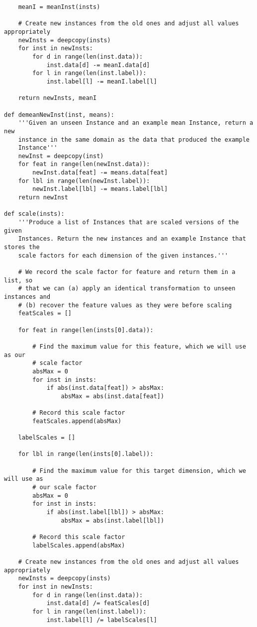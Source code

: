 \documentclass{article}
\begin{document}
\begin{verbatim}
    meanI = meanInst(insts)

    # Create new instances from the old ones and adjust all values appropriately
    newInsts = deepcopy(insts)
    for inst in newInsts:
        for d in range(len(inst.data)):
            inst.data[d] -= meanI.data[d]
        for l in range(len(inst.label)):
            inst.label[l] -= meanI.label[l]
    
    return newInsts, meanI

def demeanNewInst(inst, means):
    '''Given an unseen Instance and an example mean Instance, return a new
    instance in the same domain as the data that produced the example
    Instance'''
    newInst = deepcopy(inst)
    for feat in range(len(newInst.data)):
        newInst.data[feat] -= means.data[feat]
    for lbl in range(len(newInst.label)):
        newInst.label[lbl] -= means.label[lbl]
    return newInst

def scale(insts):
    '''Produce a list of Instances that are scaled versions of the given
    Instances. Return the new instances and an example Instance that stores the
    scale factors for each dimension of the given instances.'''

    # We record the scale factor for feature and return them in a list, so
    # that we can (a) apply an identical transformation to unseen instances and
    # (b) recover the feature values as they were before scaling
    featScales = []

    for feat in range(len(insts[0].data)):

        # Find the maximum value for this feature, which we will use as our
        # scale factor
        absMax = 0
        for inst in insts:
            if abs(inst.data[feat]) > absMax:
                absMax = abs(inst.data[feat])

        # Record this scale factor
        featScales.append(absMax)

    labelScales = []    

    for lbl in range(len(insts[0].label)):

        # Find the maximum value for this target dimension, which we will use as
        # our scale factor
        absMax = 0
        for inst in insts:
            if abs(inst.label[lbl]) > absMax:
                absMax = abs(inst.label[lbl])

        # Record this scale factor
        labelScales.append(absMax)

    # Create new instances from the old ones and adjust all values appropriately
    newInsts = deepcopy(insts)
    for inst in newInsts:
        for d in range(len(inst.data)):
            inst.data[d] /= featScales[d]
        for l in range(len(inst.label)):
            inst.label[l] /= labelScales[l]


\end{verbatim}
\end{document}
